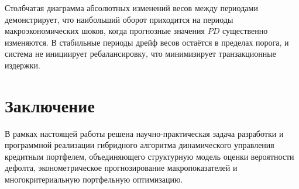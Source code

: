 \documentclass[]{article}
\begin{document}
	Столбчатая диаграмма абсолютных изменений весов между периодами демонстрирует, что наибольший
оборот приходится на периоды макроэкономических шоков, когда прогнозные значения $PD$ существенно
изменяются. В стабильные периоды дрейф весов остаётся в пределах порога, и система не инициирует
ребалансировку, что минимизирует транзакционные издержки.


	\section*{Заключение}

	В рамках настоящей работы решена научно-практическая задача разработки и программной реализации
	гибридного алгоритма динамического управления кредитным портфелем, объединяющего структурную
	модель оценки вероятности дефолта, эконометрическое прогнозирование макропоказателей и
	многокритериальную портфельную оптимизацию.
\end{document}
